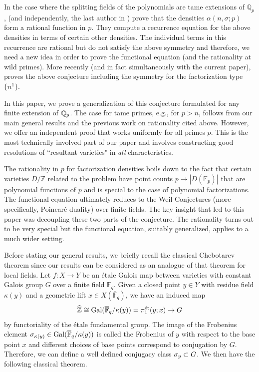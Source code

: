 \documentclass[10pt]{article}
\theoremstyle{plain}
\theoremstyle{definition}
\numberwithin{equation}{section}
\begin{document}
In the case where the splitting fields of the polynomials are tame extensions of $\mathbb{Q}_p$, \cite{del_corso_dvornicich_2000} (and independently, the last author in \cite{john}) prove that the densities $\alpha(n,\sigma;p)$ form a rational function in $p$. They compute a recurrence equation for the above densities in terms of certain other densities. The individual terms in this recurrence are rational but do not satisfy the above symmetry and therefore, we need a new idea in order to prove the functional equation (and the rationality at wild primes). More recently (and in fact simultaneously with the current paper), \cite{roy} proves the above conjecture including the symmetry for the factorization type $\{n^1\}$.

In this paper, we prove a generalization of this conjecture formulated for any finite extension of ${\mathbb Q}_p$. The case for tame primes, e.g., for $p > n$, follows from our main general results and the previous work on rationality cited above. However, we offer an independent proof that works uniformly for all primes $p$. This is the most technically involved part of our paper and involves constructing good resolutions of ``resultant varieties" in \emph{all} characteristics. 

The rationality in $p$ for factorization densities boils down to the fact that certain varieties $D/\mathbb Z$ related to the problem have point counts $p \to |D(\mathbb F_p)|$ that are polynomial functions of $p$ and is special to the case of polynomial factorizations. The functional equation ultimately reduces to the Weil Conjectures (more specifically, Poincar\'e duality) over finite fields. The key insight that led to this paper was decoupling these two parts of the conjecture. The rationality turns out to be very special but the functional equation, suitably generalized, applies to a much wider setting.

Before stating our general results, we briefly recall the classical Chebotarev theorem since our results can be considered as an analogue of that theorem for local fields. Let $f: X \to Y$ be an \'etale Galois map between varieties with constant Galois group $G$ over a finite field $\mathbb F_q$. Given a closed point $y \in Y$ with residue field $\kappa(y)$ and a geometric lift $x \in X(\overline{\mathbb F}_q)$, we have an induced map
\[\widehat{\mathbb Z} \cong \operatorname{Gal}(\overline{\mathbb F}_q/\kappa(y)) = \pi_1^{\text{\'et}}(y;x) \to G\]
by functoriality of the \'etale fundamental group. The image of the Frobenius element $\sigma_{\kappa(y)} \in \operatorname{Gal}(\overline{\mathbb F}_q/\kappa(y))$ is called the Frobenius of $y$ with respect to the base point $x$ and different choices of base points correspond to conjugation by $G$. Therefore, we can define a well defined conjugacy class $\sigma_y \subset G$. We then have the following classical theorem.
\end{document}
